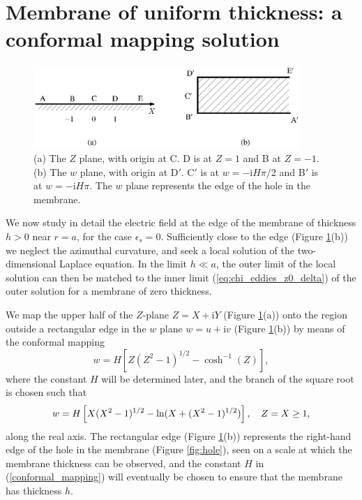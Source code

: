 \section{Membrane of uniform thickness: a conformal mapping solution
\label{sec:conformal_map}}

\begin{figure}[ht]
\begin{center}
\includegraphics[width=0.9\textwidth,clip=true]{eddies/eddy_fig2a.eps}
\caption{(a) The $Z$ plane, with origin at C. D is at $Z=1$ and B at $Z=-1$.
(b) The $w$ plane, with origin at D$'$. C$'$ is at $w=-\text{i}H\pi/2$
and B$'$ is at $w=-\text{i}H\pi$. The $w$ plane represents the edge of the hole
in the membrane. \label{fig:z_plane}}
\end{center}
\end{figure}

We now study in detail the electric field
at the edge of the membrane of thickness $h>0$ near $r=a$,
for the case $\epsilon_s=0$. Sufficiently close
to the edge (Figure \ref{fig:z_plane}(b)) we neglect the azimuthal curvature,
and seek a local solution of the two-dimensional Laplace equation.
In the limit $h\ll a$, the outer limit of the
local solution can then be matched
to the inner limit
(\ref{eq:chi_eddies_z0_delta}) of the outer solution
for a membrane of zero thickness.

We map the upper half
of the $Z$-plane $Z=X+\text{i}Y$ (Figure \ref{fig:z_plane}(a)) onto the region outside a
rectangular edge in the $w$ plane $w=u+\text{i}v$ (Figure \ref{fig:z_plane}(b))
by means of the conformal mapping \cite{driscoll2002}
\begin{equation}
w=H\left\lbrack Z(Z^2-1)^{1/2}-\cosh^{-1}(Z)\right\rbrack,
\label{conformal_mapping}
\end{equation}
where the constant $H$ will be determined later, and
the branch of the square root is chosen such that
\begin{equation}
w=H\left\lbrack X(X^2-1)^{1/2}-\ln(X+(X^2-1)^{1/2})\right\rbrack,
\hskip 10pt Z=X\ge 1,
\end{equation}
along the real axis.
The rectangular edge (Figure \ref{fig:z_plane}(b)) represents the right-hand edge of the 
hole in the membrane (Figure \ref{fig:hole}), seen on a scale at which the membrane thickness
can be observed, and
the constant $H$ in (\ref{conformal_mapping}) will eventually be chosen
to ensure that the membrane has thickness $h$.

